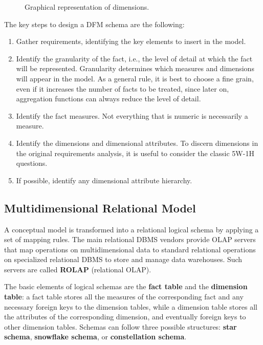 \begin{figure}[H]
    \centering
    
    \caption{Graphical representation of dimensions.}
\end{figure}
The key steps to design a DFM schema are the following:
\begin{enumerate}[noitemsep]
    \item Gather requirements, identifying the key elements to insert in the model.
    \item Identify the granularity of the fact, i.e., the level of detail at which the fact will be represented. Granularity determines which measures and dimensions will appear in the model. As a general rule, it is best to choose a fine grain, even if it increases the number of facts to be treated, since later on, aggregation functions can always reduce the level of detail.
    \item Identify the fact measures. Not everything that is numeric is necessarily a measure.
    \item Identify the dimensions and dimensional attributes. To discern dimensions in the original requirements analysis, it is useful to consider the classic 5W-1H questions.
    \item If possible, identify any dimensional attribute hierarchy.
\end{enumerate}

\subsection{Multidimensional Relational Model}

A conceptual model is transformed into a relational logical schema by applying a set of mapping rules. The main relational DBMS vendors provide OLAP servers that map operations on multidimensional data to standard relational operations on specialized relational DBMS to store and manage data warehouses. Such servers are called \textbf{ROLAP} (relational OLAP).

The basic elements of logical schemas are the \textbf{fact table} and the \textbf{dimension table}: a fact table stores all the measures of the corresponding fact and any necessary foreign keys to the dimension tables, while a dimension table stores all the attributes of the corresponding dimension, and eventually foreign keys to other dimension tables. Schemas can follow three possible structures: \textbf{star schema}, \textbf{snowflake schema}, or \textbf{constellation schema}. 

